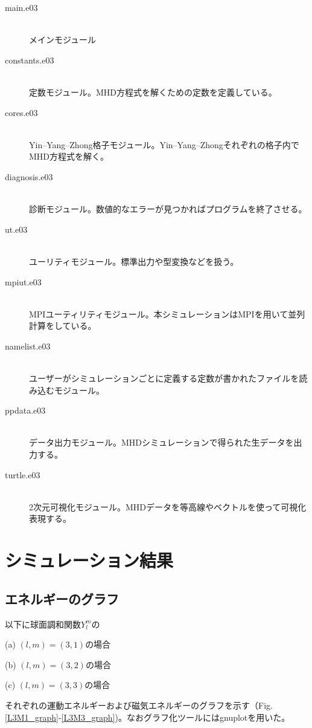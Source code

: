 \documentclass[12pt]{jsarticle}
\begin{document}
\begin{description}
  \item[main.e03]\mbox{}\\
  メインモジュール
  \item[constants.e03]\mbox{}\\
  定数モジュール。MHD方程式を解くための定数を定義している。
  \item[cores.e03]\mbox{}\\
  Yin--Yang--Zhong格子モジュール。Yin--Yang--Zhongそれぞれの格子内でMHD方程式を解く。
  \item [diagnosis.e03]\mbox{}\\
  診断モジュール。数値的なエラーが見つかればプログラムを終了させる。
  \item [ut.e03]\mbox{}\\
  ユーリティモジュール。標準出力や型変換などを扱う。
  \item [mpiut.e03]\mbox{}\\
  MPIユーティリティモジュール。本シミュレーションはMPIを用いて並列計算をしている。
  \item [namelist.e03]\mbox{}\\
  ユーザーがシミュレーションごとに定義する定数が書かれたファイルを読み込むモジュール。
  \item [ppdata.e03]\mbox{}\\
  データ出力モジュール。MHDシミュレーションで得られた生データを出力する。
  \item [turtle.e03]\mbox{}\\
  2次元可視化モジュール。MHDデータを等高線やベクトルを使って可視化表現する。
\end{description}



\section{シミュレーション結果}

\subsection{エネルギーのグラフ}
以下に球面調和関数$Y_l^m$の
\begin{description}
\item{(a)} $(l,m)=(3,1)$の場合
\item{(b)} $(l,m)=(3,2)$の場合
\item{(c)} $(l,m)=(3,3)$の場合
\end{description}
それぞれの運動エネルギーおよび磁気エネルギーのグラフを示す（Fig.\ref{L3M1_graph}-\ref{L3M3_graph})。なおグラフ化ツールにはgnuplotを用いた。
\end{document}
